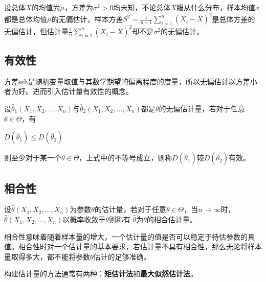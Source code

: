 \documentclass[11pt]{book}
\newcounter{#2}
\newcounter{#2}[#1]
\numberwithin{#2}{#1}
\begin{document}
设总体$X$的均值为$\mu $，方差为$\sigma^2>0$均未知，不论总体$X$服从什么分布，样本均值$\overline{x}$都是总体均值$\mu $的无偏估计，样本方差$ S^2 =\frac{1}{n-1}\sum\limits_{i=1}^{n}(X_i-\overline{X})^2$是总体方差的无偏估计，但估计量$ \frac{1}{n}\sum\limits_{i=1}^{n}(X_i-\overline{X})^2$却不是$\sigma^2$的无偏估计。
\subsection{有效性}
方差ssh是随机变量取值与其数学期望的偏离程度的度量，所以无偏估计以方差小者为好。进而引入估计量有效性的概念。
\begin{newdef}
	设$\hat{\theta}_1(X_1,X_2,\dots,X_n)$与$\hat{\theta}_2(X_1,X_2,\dots,X_n)$都是$\theta$的无偏估计量，若对于任意$\theta\in\Theta$，有
	\begin{center}
		$D(\hat{\theta}_1) \le D(\hat{\theta}_2)$
	\end{center}
	则至少对于某一个$\theta\in\Theta$，上式中的不等号成立，则称$D(\hat{\theta}_1)$较$D(\hat{\theta}_2)$有效。
\end{newdef}
\subsection{相合性}
\begin{newdef}
	设$\hat{\theta}(X_1,X_2,\dots,X_n)$为参数$\theta$的估计量，若对于任意$\theta\in\Theta$，当$n\to\infty$时，$\hat{\theta}(X_1,X_2,\dots,X_n)$以概率收敛于$\theta$则称有
	$\hat{\theta}$为$\theta$的相合估计量。
\end{newdef}
相合性意味着随着样本量的增大，一个估计量的值是否可以稳定于待估参数的真值。相合性时对一个估计量的基本要求，若估计量不具有相合性，那么无论将样本量取得多大，都不能将参数$\theta$估计的足够准确。
	
	构建估计量的方法通常有两种：\textbf{矩估计法}和\textbf{最大似然估计法}。
	
\end{document}
